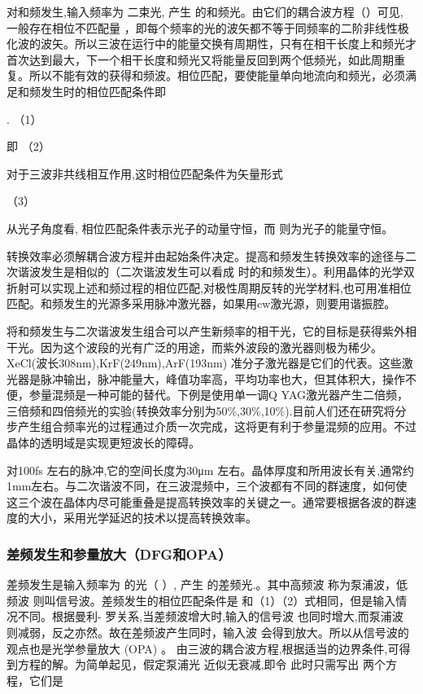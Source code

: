 对和频发生,输入频率为  二束光, 产生 的和频光。由它们的耦合波方程（）可见, 一般存在相位不匹配量 ，即每个频率的光的波矢都不等于同频率的二阶非线性极化波的波矢。所以三波在运行中的能量交换有周期性，只有在相干长度上和频光才首次达到最大，下一个相干长度和频光又将能量反回到两个低频光，如此周期重复。所以不能有效的获得和频波。相位匹配，要使能量单向地流向和频光，必须满足和频发生时的相位匹配条件即

.                       （1）

即                                                     （2）

对于三波非共线相互作用,这时相位匹配条件为矢量形式

                                       （3）             
                                                          
从光子角度看, 相位匹配条件表示光子的动量守恒，而 则为光子的能量守恒。

转换效率必须解耦合波方程并由起始条件决定。提高和频发生转换效率的途径与二次谐波发生是相似的（二次谐波发生可以看成 时的和频发生）。利用晶体的光学双折射可以实现上述和频过程的相位匹配,对极性周期反转的光学材料,也可用准相位匹配。和频发生的光源多采用脉冲激光器，如果用cw激光源，则要用谐振腔。

将和频发生与二次谐波发生组合可以产生新频率的相干光，它的目标是获得紫外相干光。因为这个波段的光有广泛的用途，而紫外波段的激光器则极为稀少。XeCl(波长308nm),KrF(249nm),ArF(193nm) 准分子激光器是它们的代表。这些激光器是脉冲输出，脉冲能量大，峰值功率高，平均功率也大，但其体积大，操作不便，参量混频是一种可能的替代。下例是使用单一调Q YAG激光器产生二倍频，三倍频和四倍频光的实验(转换效率分别为50\%,30\%,10\%).目前人们还在研究将分步产生组合频率光的过程通过介质一次完成，这将更有利于参量混频的应用。不过晶体的透明域是实现更短波长的障碍。
         
对100fs 左右的脉冲,它的空间长度为30μm 左右。晶体厚度和所用波长有关,通常约1mm左右。与二次谐波不同，在三波混频中，三个波都有不同的群速度，如何使这三个波在晶体内尽可能重叠是提高转换效率的关键之一。通常要根据各波的群速度的大小，采用光学延迟的技术以提高转换效率。

\subsubsection{差频发生和参量放大（DFG和OPA）}


差频发生是输入频率为  的光（ ）, 产生 的差频光.。其中高频波 称为泵浦波，低频波 则叫信号波。差频发生的相位匹配条件是 和（1）（2）式相同，但是输入情况不同。根据曼利- 罗关系,当差频波增大时,输入的信号波 也同时增大,而泵浦波 则减弱，反之亦然。故在差频波产生同时，输入波 会得到放大。所以从信号波的观点也是光学参量放大 (OPA) 。 
由三波的耦合波方程,根据适当的边界条件,可得到方程的解。为简单起见，假定泵浦光 近似无衰减,即令 此时只需写出  两个方程，它们是

